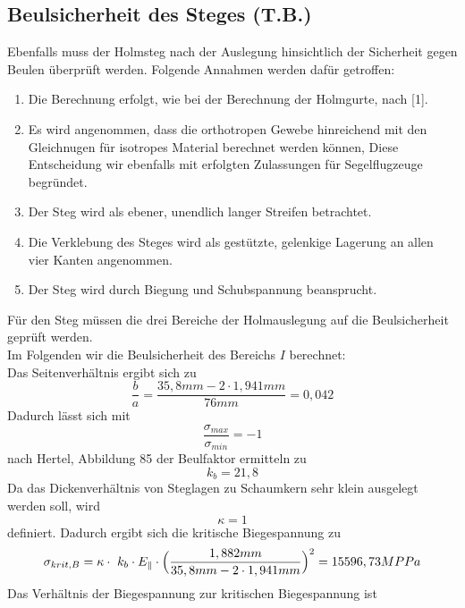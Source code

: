\subsection{Beulsicherheit des Steges (T.B.)}
Ebenfalls muss der Holmsteg nach der Auslegung hinsichtlich der Sicherheit gegen Beulen überprüft werden. Folgende Annahmen werden dafür getroffen:\\
\begin{enumerate}
	\item Die Berechnung erfolgt, wie bei der Berechnung der Holmgurte, nach [1].
	\item Es wird angenommen, dass die orthotropen Gewebe hinreichend mit den Gleichnugen für isotropes Material berechnet werden können, Diese Entscheidung wir ebenfalls mit erfolgten Zulassungen für Segelflugzeuge begründet.
	\item Der Steg wird als ebener, unendlich langer Streifen betrachtet.
	\item Die Verklebung des Steges wird als gestützte, gelenkige Lagerung an allen vier Kanten angenommen.
	\item Der Steg wird durch Biegung und Schubspannung beansprucht.
\end{enumerate}
Für den Steg müssen die drei Bereiche der Holmauslegung auf die Beulsicherheit geprüft werden. \\
\noindent Im Folgenden wir die Beulsicherheit des Bereichs $I$ berechnet:\\
\noindent Das Seitenverhältnis ergibt sich zu 
\begin{equation}
	\frac{b}{a}=\frac{35,8 mm-2\cdot 1,941 mm}{76 mm}=0,042
\end{equation}
Dadurch lässt sich mit 
\begin{equation}
	\frac{\sigma_{max}}{\sigma_{min}}=-1
\end{equation}
nach Hertel, Abbildung 85 der Beulfaktor ermitteln zu
\begin{equation}
	k_{b} = 21,8
\end{equation}
Da das Dickenverhältnis von Steglagen zu Schaumkern sehr klein ausgelegt werden soll, wird
\begin{equation}
	\kappa = 1
\end{equation}
definiert. Dadurch ergibt sich die kritische Biegespannung zu
\begin{equation}
	\sigma_{krit,B}=\kappa\cdot\ k_{b}\cdot E_{\parallel}\cdot\Bigl(\frac{1,882 mm}{35,8 mm-2\cdot 1,941 mm}\Bigr)^{2}=15596,73MPPa
\end{equation}
Das Verhältnis der Biegespannung zur kritischen Biegespannung ist
